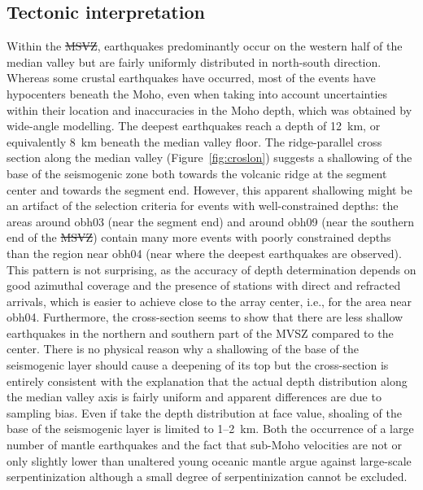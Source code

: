 \documentclass[jgr]{agu2001}
\providecommand{\DIFadd}[1]{{\protect\color{blue}\uwave{#1}}} %
\providecommand{\DIFdel}[1]{{\protect\color{red}\sout{#1}}}                      %
\providecommand{\DIFaddbegin}{} %
\providecommand{\DIFaddend}{} %
\providecommand{\DIFdelbegin}{} %
\providecommand{\DIFdelend}{} %
\begin{document}
\begin{article}
\subsection{Tectonic interpretation}

Within the \DIFdelbegin \DIFdel{MSVZ}\DIFdelend \DIFaddbegin \DIFadd{MVSZ}\DIFaddend , earthquakes predominantly occur on the western half of the median valley but are
fairly uniformly distributed in north-south direction.  Whereas some
crustal earthquakes have occurred, most of the events have hypocenters
beneath the Moho, even when taking into account uncertainties within
their location and inaccuracies in the Moho depth, which was obtained
by wide-angle modelling.  The deepest earthquakes reach a depth of 
12~km, or equivalently 8~km beneath the median valley floor. The ridge-parallel cross section
along the median valley (Figure~\ref{fig:croslon}) suggests a
shallowing of the base of the seismogenic zone both towards the
volcanic ridge at the segment center and towards the segment end.
However, this apparent shallowing might be an artifact of the
selection criteria for events with well-constrained depths: the areas
around obh03 (near the segment end) and around obh09 (near
the southern end of the \DIFdelbegin \DIFdel{MSVZ}\DIFdelend \DIFaddbegin \DIFadd{MVSZ}\DIFaddend ) contain many more
events with poorly constrained depths than the region
near obh04 (near where the deepest earthquakes are observed).  This
pattern is not surprising, as the accuracy of depth determination
depends on good azimuthal coverage and the presence of stations with
direct and refracted arrivals, which is easier to achieve close to the
array center, i.e., for the area near obh04.  Furthermore, the cross-section seems to show that there are less
shallow earthquakes in the northern  and
southern part of the MVSZ compared to the center.  There is no physical reason why a shallowing of
the base of the seismogenic layer should cause a deepening of 
its top but the cross-section is entirely consistent with
the explanation that the actual depth distribution along the median
valley axis is fairly uniform and apparent differences are due to
sampling bias. Even if take the depth distribution at face value,
shoaling of the base of the seismogenic layer is limited to 1--2~km.
Both the occurrence of a large number of mantle earthquakes and the
fact that sub-Moho velocities are not or only slightly lower than
unaltered young oceanic mantle argue against large-scale
serpentinization although a small degree of serpentinization cannot be
excluded.


\end{article}
\end{document}
